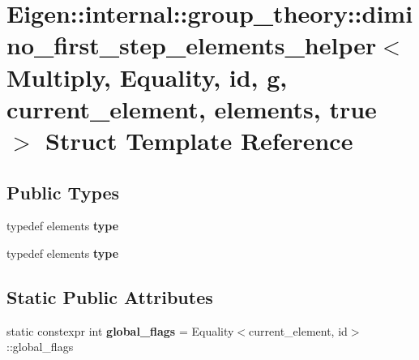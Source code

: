 \hypertarget{struct_eigen_1_1internal_1_1group__theory_1_1dimino__first__step__elements__helper_3_01_multiply9b4d61ec31d850d0ed180608dd79e37f}{}\section{Eigen\+:\+:internal\+:\+:group\+\_\+theory\+:\+:dimino\+\_\+first\+\_\+step\+\_\+elements\+\_\+helper$<$ Multiply, Equality, id, g, current\+\_\+element, elements, true $>$ Struct Template Reference}
\label{struct_eigen_1_1internal_1_1group__theory_1_1dimino__first__step__elements__helper_3_01_multiply9b4d61ec31d850d0ed180608dd79e37f}
\subsection*{Public Types}
\begin{DoxyCompactItemize}
\item 
\mbox{\label{struct_eigen_1_1internal_1_1group__theory_1_1dimino__first__step__elements__helper_3_01_multiply9b4d61ec31d850d0ed180608dd79e37f_ae85a7e79fa072af334ef529c7e66785f}} 
typedef elements {\bfseries type}
\item 
\mbox{\label{struct_eigen_1_1internal_1_1group__theory_1_1dimino__first__step__elements__helper_3_01_multiply9b4d61ec31d850d0ed180608dd79e37f_ae85a7e79fa072af334ef529c7e66785f}} 
typedef elements {\bfseries type}
\end{DoxyCompactItemize}
\subsection*{Static Public Attributes}
\begin{DoxyCompactItemize}
\item 
\mbox{\label{struct_eigen_1_1internal_1_1group__theory_1_1dimino__first__step__elements__helper_3_01_multiply9b4d61ec31d850d0ed180608dd79e37f_a13c386a75a69b5dfd2f26a5057b24ee3}} 
static constexpr int {\bfseries global\+\_\+flags} = Equality$<$current\+\_\+element, id$>$\+::global\+\_\+flags
\end{DoxyCompactItemize}


